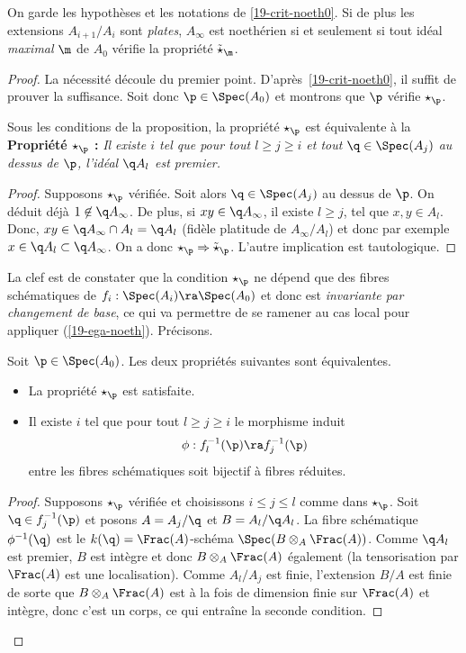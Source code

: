 \documentclass[10pt]{../fichiers-configuration-latex/smfart}
\begin{document}
\begin{proposition}\label{19-crit-noeth} On garde les hypothèses et les notations de
\ref{19-crit-noeth0}. Si de plus les extensions $A_{i+1}/A_{i}$ sont \emph{plates}, $A_\infty$ est
noethérien si et seulement si tout idéal \emph{maximal} $\m$ de $A_0$ vérifie la propriété
$\tilde\star_\m$.\end{proposition}

\begin{proof}La nécessité découle du premier point.  D'après~\ref{19-crit-noeth0}, il suffit de
prouver la suffisance. Soit donc $\p\in\Spec(A_0)$ et montrons que $\p$ vérifie $\star_\p$.


\begin{lemme}Sous les conditions de la proposition, la propriété $\star_\p$ est équivalente à la
\textbf{Propriété $\star_\p$ : } \emph{Il existe $i$ tel que pour tout $l\geq j\geq i$ et tout
$\q\in\Spec(A_j)$ au dessus de $\p$, l'idéal $\q A_{l}$ est premier.} \end{lemme} \begin{proof}
Supposons $\star_\p$ vérifiée. Soit alors $\q\in\Spec(A_j)$ au dessus de $\p$.  On déduit déjà
$1\not\in\q A_\infty$. De plus, si $xy\in\q A_\infty$, il existe $l\geq j$, tel que $x,y\in A_l$.
Donc, $xy\in\q A_\infty\cap A_l=\q A_l$ (fidèle platitude de $A_\infty/A_l$) et donc par exemple
$x\in\q A_l\subset\q A_\infty$. On a donc $\star_\p\Rightarrow\tilde\star_\p$. L'autre implication
est tautologique.\end{proof}

La clef est de constater que la condition $\star_\p$ ne dépend que des fibres schématiques de $f_i :
\Spec(A_i)\ra\Spec(A_0)$ et donc est \emph{invariante par changement de base}, ce qui va permettre
de se ramener au cas local pour appliquer (\ref{19-ega-noeth}). Précisons.

\begin{lemme}\label{19-star-fib} Soit $\p\in\Spec(A_0)$. Les deux propriétés suivantes sont
équivalentes.  \begin{itemize} \item  La propriété $\star_\p$ est satisfaite.  \item Il existe $i$
tel que pour tout $l\geq j\geq i$ le morphisme induit $$\phi : f_l^{-1}(\p)\ra f_{j}^{-1}(\p)$$
entre les fibres schématiques soit bijectif à fibres réduites.  \end{itemize} \end{lemme}
\begin{proof} Supposons  $\star_\p$  vérifiée et choisissons $i\leq j\leq l$ comme dans $\star_\p$.
Soit $\q\in f_j^{-1}(\p)$ et posons $A=A_j/\q$ et $B=A_l/\q A_l$.  La fibre schématique
$\phi^{-1}(\q)$ est le $k(\q)=\Frac(A)$-schéma $\Spec(B\otimes_A \Frac(A))$. Comme $\q A_l$ est
premier, $B$ est intègre et donc $B\otimes_A \Frac(A)$ également (la tensorisation par $\Frac(A)$
est une localisation). Comme $A_l/A_j$ est finie, l'extension $B/A$ est finie de sorte que
$B\otimes_A \Frac(A)$ est à la fois de dimension finie sur $\Frac(A)$ et intègre, donc c'est un
corps, ce qui entraîne la seconde condition.


\end{proof}
\end{proof}
\end{document}
